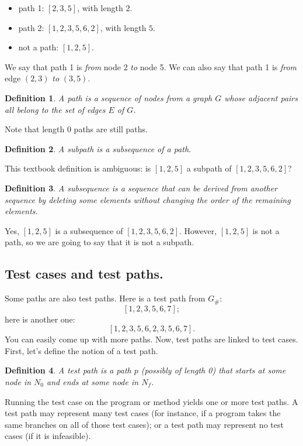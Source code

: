 \documentclass[11pt]{article}
\newtheorem{defn}{Definition}
\begin{document}
\begin{itemize}
\item path 1: $[2, 3, 5]$, with length $2$.
\item path 2: $[1, 2, 3, 5, 6, 2]$, with length $5$.
\item not a path: $[1, 2, 5]$.
\end{itemize}

We say that path 1 is \emph{from} node 2 \emph{to} node 5. We
can also say that path 1 is \emph{from} edge $(2, 3)$ \emph{to} 
$(3, 5)$.

\begin{defn} 
A \emph{path} is a sequence of nodes from a graph $G$ whose 
adjacent pairs all belong to the set of edges $E$ of $G$.
\end{defn}

Note that length 0 paths are still paths.

\begin{defn} 
A \emph{subpath} is a subsequence of a path.
\end{defn}
This textbook definition is ambiguous: is $[1,2,5]$ a subpath of
$[1,2,3,5,6,2]$?

\begin{defn} 
  A \emph{subsequence} is a sequence that can be derived from another
  sequence by deleting some elements without changing the order of the
  remaining elements.
\end{defn}
Yes, $[1,2,5]$ is a subsequence of $[1,2,3,5,6,2]$. However, $[1,2,5]$ is not a
path, so we are going to say that it is not a subpath.

\subsection*{Test cases and test paths.} Some paths are also test paths.
Here is a test path from
$G_\#$: 
\[ [1, 2, 3, 5, 6, 7]; \]
here is another one:
\[ [1, 2, 3, 5, 6, 2, 3, 5, 6, 7]. \]
You can easily come up with more paths. Now, test paths are linked to
test cases. First, let's define the notion of a test path.

\begin{defn} A \emph{test path} is a path $p$ (possibly of length 0)
that starts at some node in $N_0$ and ends at some node in $N_f$.
\end{defn}

Running the test case on the program or method yields one or more test
paths. A test path may represent many test cases (for instance, if a
program takes the same branches on all of those test cases); or a 
test path may represent no test cases (if it is infeasible).
\end{document}
